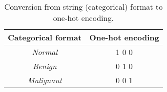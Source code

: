 \begin{table}[h]
\centering
\begin{tabular}{|c|c|}
\hline
\textbf{Categorical format} & \textbf{One-hot encoding} \\ \hline
\textit{Normal}             & 1 0 0            \\ \hline
\textit{Benign}             & 0 1 0            \\ \hline
\textit{Malignant}          & 0 0 1            \\ \hline
\end{tabular}
\caption{Conversion from string (categorical) format to one-hot encoding.}
\label{tab:one-hot-encoding-example}
\end{table}